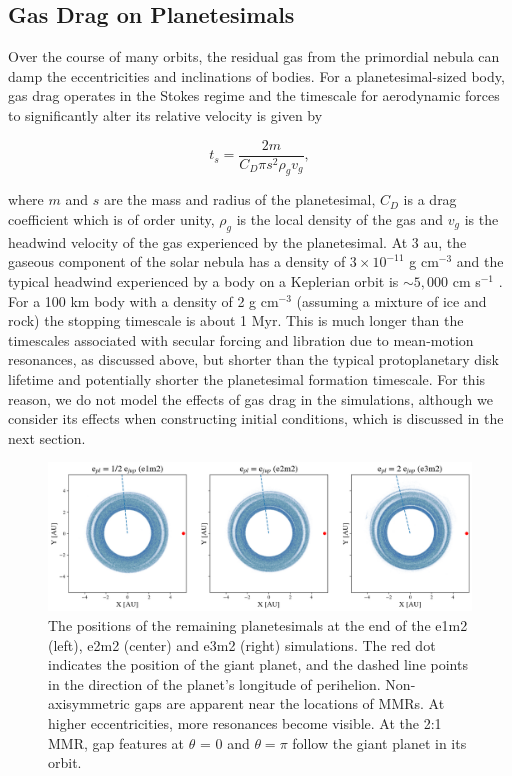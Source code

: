 \subsection{Gas Drag on Planetesimals}\label{sec:pl_drag}

Over the course of many orbits, the residual gas from the primordial nebula can damp the eccentricities and inclinations of 
bodies. For a planetesimal-sized body, gas drag operates in the Stokes regime and the timescale for aerodynamic forces to 
significantly alter its relative velocity is given by \cite{adachi76}

\begin{equation}\label{eq:ts_stokes}
    t_{s} = \frac{2 m}{C_{D} \pi s^{2} \rho_{g} v_{g}},
\end{equation}

\noindent where $m$ and $s$ are the mass and radius of the planetesimal, $C_{D}$ is a drag coefficient which is of order unity, 
$\rho_{g}$ is the local density of the gas and $v_{g}$ is the headwind velocity of the gas experienced by the planetesimal. At 3 
au, the gaseous component of the solar nebula has a density of $3 \times 10^{-11}$ g cm$^{-3}$ and the typical headwind 
experienced by a body on a Keplerian orbit is $\sim 5,000$ cm s$^{-1}$ \cite{hayashi81}. For a 100 km body with a density of 2 g 
cm$^{-3}$ (assuming a mixture of ice and rock) the stopping timescale is about 1 Myr. This is much longer than the timescales 
associated with secular forcing and libration due to mean-motion resonances, as discussed above, but shorter than the typical 
protoplanetary disk lifetime and potentially shorter the planetesimal formation timescale. For this reason, we do not model the 
effects of gas drag in the simulations, although we consider its effects when constructing initial conditions, which is discussed in 
the next section.

\begin{figure}
\begin{center}
    \includegraphics[width=\textwidth]{figures/grind/xy.png}
    \caption{The positions of the remaining planetesimals at the end of the e1m2 (left), e2m2 (center) and e3m2 (right) 
    simulations. The red dot indicates the position of the giant planet, and the dashed line points in the direction of the planet's 
    longitude of perihelion. Non-axisymmetric gaps are apparent near the locations of MMRs. At higher eccentricities, more 
    resonances become visible. At the 2:1 MMR, gap features at $\theta$ = 0 
    and $\theta = \pi$ follow the giant planet in its orbit.\label{fig:xy}}
\end{center}
\end{figure}

